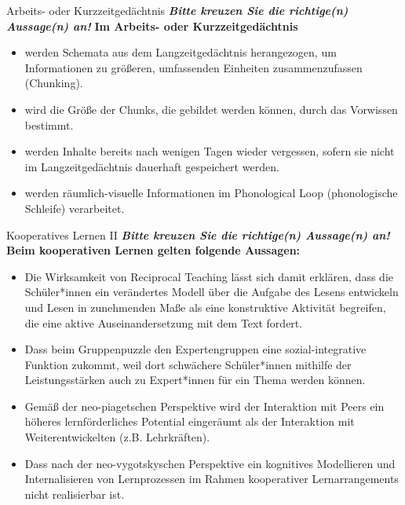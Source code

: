 \documentclass[a4paper]{article}
\newcommand{\ACorrectAnswer}{\rlap{$\square$}{\raisebox{2pt}{\large\hspace{1pt}\ding{51}}}\hspace{-2.5pt}}
\newcommand{\AWrongAnswer}{\rlap{$\square$}{\large\hspace{1pt}\ding{55}}}
\newcommand{\AnUnsureAnswer}{\rlap{$\square$}{\large\hspace{1pt}\textbf?}}
\newcommand{\defaultCorrect}{\ding{51}}
\newcommand{\defaultWrong}{\ding{55}}
\newcommand{\defaultUnsure}{\textbf{?}}
\newenvironment{answers}{\begin{itemize}}{\end{itemize}}
\newcommand{\correct}{\defaultCorrect}
\newcommand{\wrong}{\defaultWrong}
\newcommand{\unsure}{\defaultUnsure}
\newenvironment{question}[2]{%
    \section[#1 \normalfont(#2)]{#1\\\small\normalfont\hyperlink{tableofcontents}{zurück zum Inhaltsverzeichnis}}%
}{%
    \newpage%
}
\newcommand{\questiontext}[1]{\textbf{#1}}
\newcommand{\assignment}[1]{\textbf{\textit{#1}}\newline}
\newenvironment{multiple-choice}[1]{%
    \begin{question}{#1}{Multiple Choice}%
    \renewenvironment{answers}{%
        \begin{multiple-choice-list}}{\end{multiple-choice-list}%
    }%
    \renewcommand{\correct}{\ACorrectAnswer}%
    \renewcommand{\wrong}{\AWrongAnswer}%
    \renewcommand{\unsure}{\AnUnsureAnswer}%
}%
{%
    \renewcommand{\correct}{\defaultCorrect}%
    \renewcommand{\wrong}{\defaultWrong}%
    \renewcommand{\unsure}{\defaultUnsure}%
    \end{question}%
}
\begin{document}
\begin{multiple-choice}{Arbeits- oder Kurzzeitgedächtnis}
    \assignment{Bitte kreuzen Sie die richtige(n) Aussage(n) an!}
    \questiontext{Im Arbeits- oder Kurzzeitgedächtnis}
    \begin{answers}
        \item[\correct] werden Schemata aus dem Langzeitgedächtnis herangezogen, um Informationen zu größeren, umfassenden Einheiten zusammenzufassen (Chunking).
        \item[\correct] wird die Größe der Chunks, die gebildet werden können, durch das Vorwissen bestimmt.
        \item[\wrong] werden Inhalte bereits nach wenigen Tagen wieder vergessen, sofern sie nicht im Langzeitgedächtnis dauerhaft gespeichert werden.
        \item[\wrong] werden räumlich-visuelle Informationen im Phonological Loop (phonologische Schleife) verarbeitet.
    \end{answers}
\end{multiple-choice}

\begin{multiple-choice}{Kooperatives Lernen II}
    \assignment{Bitte kreuzen Sie die richtige(n) Aussage(n) an!}
    \questiontext{Beim kooperativen Lernen gelten folgende Aussagen:}
    \begin{answers}
        \item[\correct] Die Wirksamkeit von Reciprocal Teaching lässt sich damit erklären, dass die Schüler*innen ein verändertes Modell über die Aufgabe des Lesens entwickeln und Lesen in zunehmenden Maße als eine konstruktive Aktivität begreifen, die eine aktive Auseinandersetzung mit dem Text fordert.
        \item[\correct] Dass beim Gruppenpuzzle den Expertengruppen eine sozial-integrative Funktion zukommt, weil dort schwächere Schüler*innen mithilfe der Leistungsstärken auch zu Expert*innen für ein Thema werden können.
        \item[\wrong] Gemäß der neo-piagetschen Perspektive wird der Interaktion mit Peers ein höheres lernförderliches Potential eingeräumt als der Interaktion mit Weiterentwickelten (z.B. Lehrkräften).
        \item[\wrong] Dass nach der neo-vygotskyschen Perspektive ein kognitives Modellieren und Internalisieren von Lernprozessen im Rahmen kooperativer Lernarrangements nicht realisierbar ist. 
    \end{answers}
\end{multiple-choice}
\end{document}
